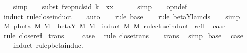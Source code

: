 \begin{isabellebody}
\ {}\ \isamarkupfalse%
\ simp\isanewline
\ \ \isamarkupfalse%
\ {\isacharparenleft}subst\ {\isacharparenleft}{}{\isacharparenright}fv{\isacharunderscore}opn{\isacharunderscore}cls{\isacharunderscore}id{}{\isacharbrackleft}\ k{\isacharequal}{}\ \ x{\isacharequal}x{\isacharbrackright}{\isacharparenright}\isanewline
\ \ \isamarkupfalse%
\ {}\ \isamarkupfalse%
\ simp\isanewline
\ \ \isamarkupfalse%
\ opn{\isacharprime}{\isacharunderscore}def\isanewline
\ \ \isamarkupfalse%
\ {\isacharparenleft}induct\ rule{\isacharcolon}close{\isachardot}induct{\isacharparenright}\isanewline
\ \ \isamarkupfalse%
\ auto\isanewline
\ \ \isamarkupfalse%
\ {\isacharparenleft}rule\ base{\isacharparenright}\isanewline
\ \ \isamarkupfalse%
\ {\isacharparenleft}rule\ beta{\isacharunderscore}Y{\isacharunderscore}lam{\isacharunderscore}cls{\isacharparenright}\isanewline
\ \ \isamarkupfalse%
\ simp\isanewline
{}\isamarkupfalse%
%
\endisatagproof
{\isafoldproof}%
%
\isadelimproof
\isanewline
%
\endisadelimproof
\isanewline
{}\isamarkupfalse%
\ M{}{\isacharcolon}\ {\isachardoublequoteopen}pbeta{\isacharasterisk}\ M\ M{\isacharprime}\ {\isasymLongrightarrow}\ beta{\isacharunderscore}Y{\isacharasterisk}\ M\ M{\isacharprime}{\isachardoublequoteclose}\isanewline
%
\isadelimproof
%
\endisadelimproof
%
\isatagproof
{}\isamarkupfalse%
\ {\isacharparenleft}induct\ M\ M{\isacharprime}\ rule{\isacharcolon}close{\isachardot}induct{\isacharparenright}\isanewline
{}\isamarkupfalse%
\ refl\ \isamarkupfalse%
\ {\isacharquery}case\ \isamarkupfalse%
\ {\isacharparenleft}rule\ close{\isachardot}refl{\isacharparenright}\isanewline
{}\isamarkupfalse%
\isanewline
{}\isamarkupfalse%
\ trans\ \isanewline
\ \ \isamarkupfalse%
\ {\isacharquery}case\ \isamarkupfalse%
\ {\isacharparenleft}rule\ close{\isachardot}trans{\isacharparenright}\isanewline
\ \ \isamarkupfalse%
\ trans\ \isamarkupfalse%
\ simp{\isacharplus}\isanewline
{}\isamarkupfalse%
\isanewline
{}\isamarkupfalse%
\ base\ \isamarkupfalse%
\ {\isacharquery}case\isanewline
\ \ \isamarkupfalse%
\ {\isacharparenleft}induct\ rule{\isacharcolon}pbeta{\isachardot}induct{\isacharparenright}\isanewline

\end{isabellebody}
